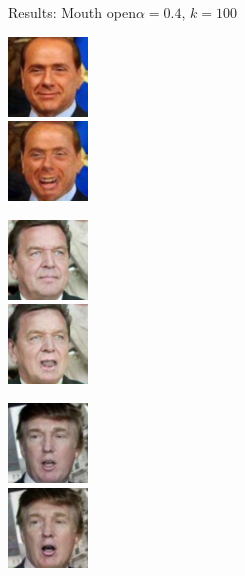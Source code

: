 \documentclass[11pt]{beamer}
\begin{document}
\begin{frame}{Results: Mouth open}{$\alpha=0.4$, $k=100$}
	\centering
	\begin{minipage}{81px}
		\includegraphics[width=80px]{../pictures/outputs/start-imgs/Berlusconi.png}\\
		\includegraphics[width=80px]{../pictures/outputs/mouth_open_alpha0.4_k100/Berlusconi.png}
	\end{minipage}%
	\begin{minipage}{81px}
		\includegraphics[width=80px]{../pictures/outputs/start-imgs/Schroeder.png}\\
		\includegraphics[width=80px]{../pictures/outputs/mouth_open_alpha0.4_k100/Schroeder.png}
	\end{minipage}%
	\begin{minipage}{81px}
		\includegraphics[width=80px]{../pictures/outputs/start-imgs/Trump.png}\\
		\includegraphics[width=80px]{../pictures/outputs/mouth_open_alpha0.4_k100/Trump.png}

\end{minipage}
\end{frame}
\end{document}
